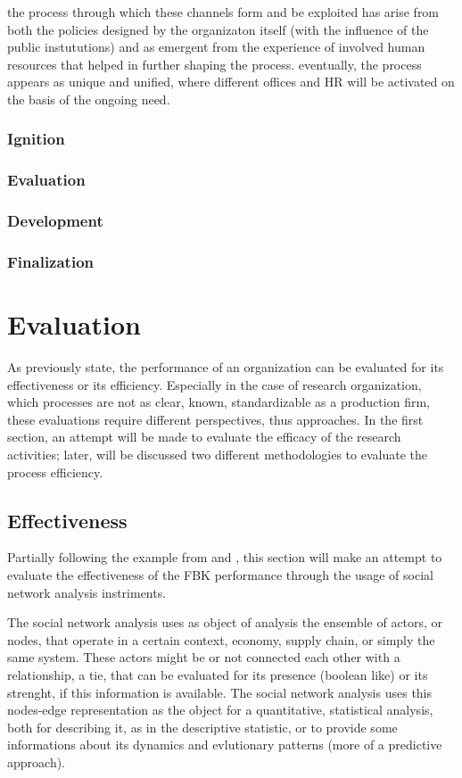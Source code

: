 the process through which these channels form and be exploited has arise from both the policies designed by the organizaton itself (with the influence of the public instututions) and as emergent from the experience of involved human resources that helped in further shaping the process. eventually, the process appears as unique and unified, where different offices and HR will be activated on the basis of the ongoing need. 

\subsubsection{Ignition}
\subsubsection{Evaluation}
\subsubsection{Development}
\subsubsection{Finalization}

\section{Evaluation}

As previously state, the performance of an organization can be evaluated for its effectiveness or its efficiency. Especially in the case of research organization, which processes are not as clear, known, standardizable as a production firm, these evaluations require different perspectives, thus approaches. In the first section, an attempt will be made to evaluate the efficacy of the research activities; later, will be discussed two different methodologies to evaluate the process efficiency. 

\subsection{Effectiveness}

Partially following the example from \citet{Giuliani2005} and \citet{Cantner2006}, this section will make an attempt to evaluate the effectiveness of the FBK performance through the usage of social network analysis instriments. 

The social network analysis uses as object of analysis the ensemble of actors, or nodes, that operate in a certain context, economy, supply chain, or simply the same system. These actors might be or not connected each other with a relationship, a tie, that can be evaluated for its presence (boolean like) or its strenght, if this information is available. The social network analysis uses this nodes-edge representation as the object for a quantitative, statistical analysis, both for describing it, as in the descriptive statistic, or to provide some informations about its dynamics and evlutionary patterns (more of a predictive approach).

